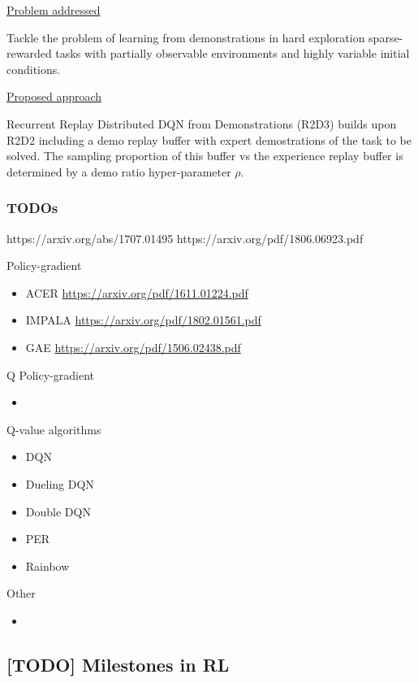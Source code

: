 \documentclass[12pt, english]{article}
\begin{document}
\underline{Problem addressed}

Tackle the problem of learning from demonstrations in hard exploration sparse-rewarded tasks with partially observable environments and highly variable initial conditions.

\underline{Proposed approach}

Recurrent Replay Distributed DQN from Demonstrations (R2D3) builds upon R2D2 including a demo replay buffer with expert demostrations of the task to be solved. The sampling proportion of this buffer vs the experience replay buffer is determined by a demo ratio hyper-parameter $\rho$.

\subsubsection{TODOs}

https://arxiv.org/abs/1707.01495
https://arxiv.org/pdf/1806.06923.pdf

Policy-gradient

\begin{itemize}
  \item ACER \url{https://arxiv.org/pdf/1611.01224.pdf}
  \item IMPALA \url{https://arxiv.org/pdf/1802.01561.pdf}
  \item GAE \url{https://arxiv.org/pdf/1506.02438.pdf}
\end{itemize}

Q Policy-gradient

\begin{itemize}
  \item
\end{itemize}

Q-value algorithms
\begin{itemize}
  \item DQN
  \item Dueling DQN
  \item Double DQN
  \item PER
  \item Rainbow
\end{itemize}

Other

\begin{itemize}
  \item
\end{itemize}




\subsection{[TODO] Milestones in RL}
\end{document}
